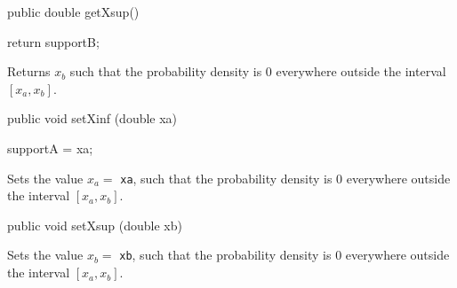\begin{htmlonly}
\end{htmlonly}
\begin{code}

   public double getXsup()\begin{hide} {
      return supportB;
   }
\end{hide}
\end{code}
\begin{tabb} Returns $x_b$ such that the probability density is 0 everywhere
 outside the interval $[x_a, x_b]$.
\end{tabb}
\begin{htmlonly}
\end{htmlonly}
\begin{code}

   public void setXinf (double xa)\begin{hide} {
      supportA = xa;
   }\end{hide}
\end{code}
\begin{tabb} Sets the value $x_a=$ \texttt{xa}, such that the probability
 density is 0 everywhere outside the interval $[x_a, x_b]$.
\end{tabb}
\begin{htmlonly}
\end{htmlonly}
\begin{code}

   public void setXsup (double xb)\begin{hide} {
      supportB = xb;
   }
}\end{hide}
\end{code}
\begin{tabb} Sets the value $x_b=$ \texttt{xb}, such that the probability
 density is 0 everywhere outside the interval $[x_a, x_b]$.
\end{tabb}
\begin{htmlonly}
\end{htmlonly}
